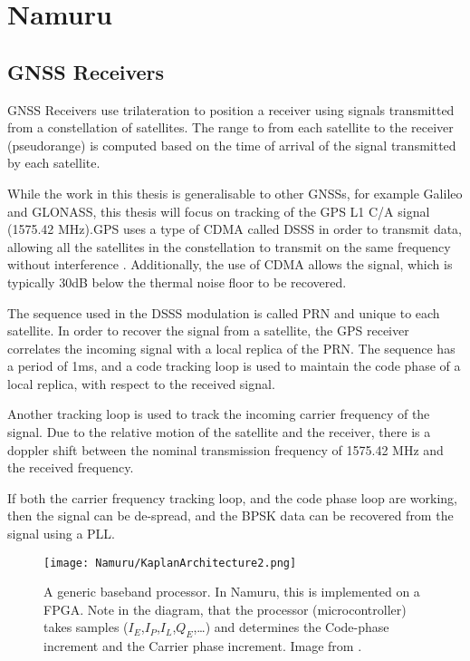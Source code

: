 \chapter{Namuru}\label{ch:Namuru}

\section{\ac{GNSS} Receivers}

\ac{GNSS} Receivers use trilateration to position a receiver using signals transmitted from a constellation of satellites. The range to from each satellite to the receiver (pseudorange) is computed based on the time of arrival of the signal transmitted by each satellite. 

While the work in this thesis is generalisable to other \ac{GNSS}s, for example Galileo and GLONASS, this thesis will focus on tracking of the GPS L1 \ac{C/A} signal (1575.42 MHz).\ac{GPS} uses a type of \ac{CDMA} called \ac{DSSS} in order to transmit data, allowing all the satellites in the constellation to transmit on the same frequency without interference \cite{Ublox}. Additionally, the use of \ac{CDMA} allows the signal, which is typically 30dB below the thermal noise floor to be recovered\cite{Gleason,Tsui}.

The sequence used in the \ac{DSSS} modulation is called \ac{PRN} and unique to each satellite. In order to recover the signal from a satellite, the GPS receiver correlates the incoming signal with a local replica of the \ac{PRN}. The sequence has a period of 1ms, and a code tracking loop is used to maintain the code phase of a local replica, with respect to the received signal. 

Another tracking loop is used to track the incoming carrier frequency of the signal. Due to the relative motion of the satellite and the receiver, there is a doppler shift between the nominal transmission frequency of 1575.42 MHz and the received frequency. 

If both the carrier frequency tracking loop, and the code phase loop are working, then the signal can be de-spread, and the \ac{BPSK} data can be recovered from the signal using a \ac{PLL}.


\begin{figure}[!htb] 
    \centering
    \texttt{[image: Namuru/KaplanArchitecture2.png]} 
    \caption{A generic baseband processor. In Namuru, this is implemented on a \ac{FPGA}. Note in the diagram, that the processor (microcontroller) takes samples ($I_E$,$I_P$,$I_L$,$Q_E$,\ldots) and determines the Code-phase increment and the Carrier phase increment. Image from \cite{Kaplan}.}
    \label{fig:KaplanArchitecture}
\end{figure}

